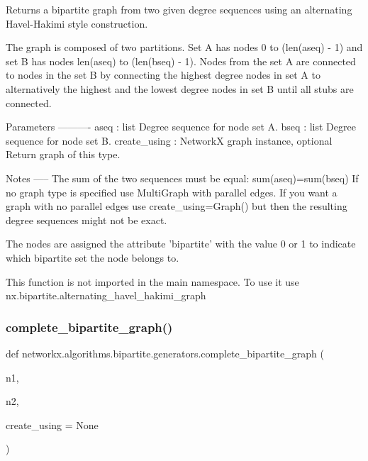 \begin{DoxyVerb}Returns a bipartite graph from two given degree sequences using
an alternating Havel-Hakimi style construction.

The graph is composed of two partitions. Set A has nodes 0 to
(len(aseq) - 1) and set B has nodes len(aseq) to (len(bseq) - 1).
Nodes from the set A are connected to nodes in the set B by
connecting the highest degree nodes in set A to alternatively the
highest and the lowest degree nodes in set B until all stubs are
connected.

Parameters
----------
aseq : list
   Degree sequence for node set A.
bseq : list
   Degree sequence for node set B.
create_using : NetworkX graph instance, optional
   Return graph of this type.

Notes
-----
The sum of the two sequences must be equal: sum(aseq)=sum(bseq)
If no graph type is specified use MultiGraph with parallel edges.
If you want a graph with no parallel edges use create_using=Graph()
but then the resulting degree sequences might not be exact.

The nodes are assigned the attribute 'bipartite' with the value 0 or 1
to indicate which bipartite set the node belongs to.

This function is not imported in the main namespace.
To use it use nx.bipartite.alternating_havel_hakimi_graph
\end{DoxyVerb}
 \mbox{\label{namespacenetworkx_1_1algorithms_1_1bipartite_1_1generators_a9db2ac2bb227f430cf8084ccf8821857}} 
\subsubsection{\texorpdfstring{complete\+\_\+bipartite\+\_\+graph()}{complete\_bipartite\_graph()}}
{\footnotesize\ttfamily def networkx.\+algorithms.\+bipartite.\+generators.\+complete\+\_\+bipartite\+\_\+graph (\begin{DoxyParamCaption}\item[{}]{n1,  }\item[{}]{n2,  }\item[{}]{create\+\_\+using = {\ttfamily None} }\end{DoxyParamCaption})}

